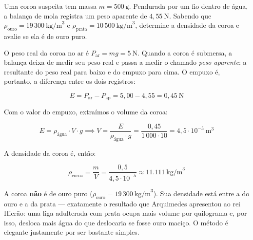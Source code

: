 \begin{exemplo}[Nível II]\label{exemplo_fluidos_empuxoex02}

Uma coroa suspeita tem massa $m = 500\ \text{g}$. Pendurada por um fio dentro de água, a balança de mola registra um peso aparente de $4{,}55\ \text{N}$. Sabendo que $\rho_\text{ouro} = 19\,300\ \text{kg/m}^3$ e $\rho_\text{prata} = 10\,500\ \text{kg/m}^3$, determine a densidade da coroa e avalie se ela é de ouro puro.
 
 
\medskip

\resolucao

O peso real da coroa no ar é $P_\text{ar} = mg = 5\ \text{N}$. Quando a coroa é submersa, a balança deixa de medir seu peso real e passa a medir o chamado \textit{peso aparente}: a resultante do peso real para baixo e do empuxo para cima. O empuxo é, portanto, a diferença entre os dois registros:
 
\begin{equation*}
    E = P_\text{ar} - P_\text{ap} = 5{,}00 - 4{,}55 = 0{,}45\ \text{N}
\end{equation*}
 
Com o valor do empuxo, extraímos o volume da coroa:
 
\begin{equation*}
    E = \rho_\text{água}\cdot V\cdot g
    \implies
    V = \frac{E}{\rho_\text{água}\cdot g} = \frac{0{,}45}{1\,000\cdot 10} = 4{,}5\cdot10^{-5}\ \text{m}^3
\end{equation*}
 
A densidade da coroa é, então:
 
\begin{equation*}
    \rho_\text{coroa} = \frac{m}{V} = \frac{0{,}5}{4{,}5\cdot10^{-5}} \approx \boxed{11.111\ \text{kg/m}^3}
\end{equation*}
 
A coroa \textbf{não} é de ouro puro ($\rho_\text{ouro} = 19\,300\ \text{kg/m}^3$). Sua densidade está entre a do ouro e a da prata — exatamente o resultado que Arquimedes apresentou ao rei Hierão: uma liga adulterada com prata ocupa mais volume por quilograma e, por isso, desloca mais água do que deslocaria se fosse ouro maciço. O método é elegante justamente por ser bastante simples.

\end{exemplo}




\vspace{0.3cm}


